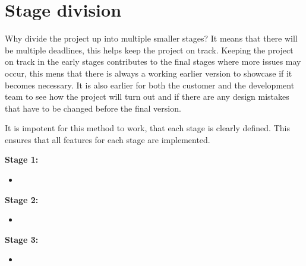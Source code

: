 \documentclass{article}
\begin{document}
    \section{Stage division}
    Why divide the project up into multiple smaller stages? It means
    that there will be multiple deadlines, this helps keep the project on
    track. Keeping the project on track in the early stages contributes to the
    final stages where more issues may occur, this mens that there is always a
    working earlier version to showcase if it becomes necessary. It is also
    earlier for both the customer and the development team to see how the
    project will turn out and if there are any design mistakes that have to be
    changed before the final version.

    It is impotent for this method to work, that each stage is clearly defined.
    This ensures that all features for each stage are implemented.

    \textbf{Stage 1:}
    \begin{itemize}
        \item 
    \end{itemize}

    \textbf{Stage 2:}
    \begin{itemize}
        \item 
    \end{itemize}

    \textbf{Stage 3:}
    \begin{itemize}
        \item 
    \end{itemize}
\end{document}
